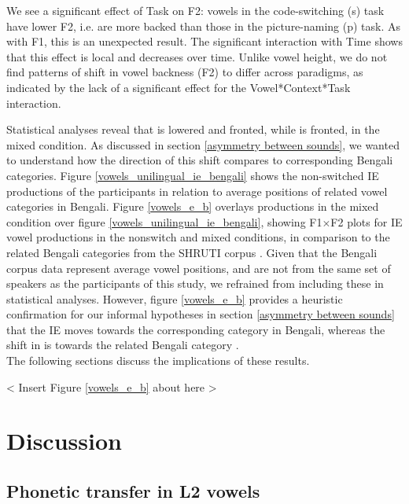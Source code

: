 \documentclass[12 pt]{article}
\newcommand{\nt}[1]{\textipa{[#1]}} %
\begin{document}
We see a significant effect of Task on F2: vowels in the code-switching (s) task have lower F2, i.e. are more backed than those in the picture-naming (p) task. As with F1, this is an unexpected result. The significant interaction with Time shows that this effect is local and decreases over time. Unlike vowel height, we do not find patterns of shift in vowel backness (F2) to differ across paradigms, as indicated by the lack of a significant effect for the Vowel*Context*Task interaction. 



\vspace{3cm}

Statistical analyses reveal that \nt{2} is lowered and fronted, while \nt{\ae} is fronted, in the mixed condition. As discussed in section \ref{asymmetry between sounds}, we wanted to understand how the direction of this shift compares to corresponding Bengali categories. Figure \ref{vowels_unilingual_ie_bengali} shows the non-switched IE productions of the participants in relation to average positions of related vowel categories in Bengali. Figure \ref{vowels_e_b} overlays productions in the mixed condition over figure \ref{vowels_unilingual_ie_bengali}, showing F1$\times$F2 plots for IE vowel productions in the nonswitch and mixed conditions, in comparison to the related Bengali categories from the SHRUTI corpus \citep{shruticorpus}. Given that the Bengali corpus data represent average vowel positions, and are not from the same set of speakers as the participants of this study, we refrained from including these in statistical analyses. However, figure \ref{vowels_e_b} provides a heuristic confirmation for our informal hypotheses in section \ref{asymmetry between sounds} that the IE \nt{\ae} moves towards the corresponding \nt{\ae} category in Bengali, whereas the shift in \nt{2} is towards the related Bengali category \nt{a:}.\\
The following sections discuss the implications of these results.

< Insert Figure \ref{vowels_e_b} about here >

\section{Discussion}


\subsection{Phonetic transfer in L2 vowels}
\end{document}
